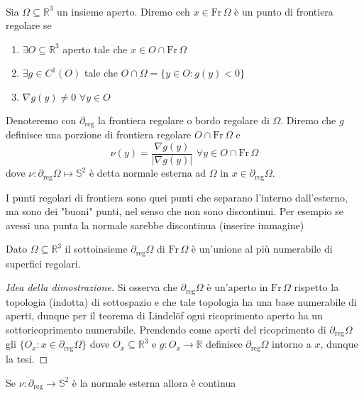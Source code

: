 \begin{definition} \hspace{1cm} \\
	Sia $\Omega \subseteq \mathbb{R}^3$ un insieme aperto. Diremo ceh $x \in \text{Fr} \, \Omega$ è un punto di frontiera regolare se
	\begin{enumerate}[label=\protect\circled{\arabic*}]
		\item $\exists O \subseteq \mathbb{R}^3$ aperto tale che $x \in O \cap \text{Fr} \, \Omega$
		\item $\exists g \in C^1(O)$ tale che $O \cap \Omega = \{y \in O : g(y) < 0 \}$
		\item $\nabla g(y) \neq 0 \, \, \forall y \in O$
	\end{enumerate}
	Denoteremo con $\partial_{\text{reg}}$ la frontiera regolare o bordo regolare di $\Omega$. Diremo che $g$ definisce una porzione di frontiera regolare
	$O \cap \text{Fr} \, \Omega$ e
	$$
	\nu(y) = \frac{\nabla g(y)}{|\nabla g(y)|} \, \, \forall y \in O \cap \text{Fr} \, \Omega
	$$
	dove $\nu: \partial_{\text{reg}} \Omega \mapsto \mathbb{S}^2$ è detta normale esterna ad $\Omega$ in $x \in \partial_{\text{reg}} \Omega$.
\end{definition}
\begin{remark}
I punti regolari di frontiera sono quei punti che separano l'interno dall'esterno, ma sono dei "buoni" punti, nel senso che non sono discontinui. Per esempio se avessi una punta la normale sarebbe discontinua (inserire immagine)
\end{remark}
\begin{prop}
	Dato $\Omega \subseteq \mathbb{R}^3$ il sottoinsieme $\partial_{\text{reg}} \Omega$ di $\text{Fr} \, \Omega$ è un'unione al più numerabile di superfici regolari.
\end{prop}
\begin{proof}[Idea della dimostrazione]
Si osserva che $\partial_{\text{reg}} \Omega$ è un'aperto in $\text{Fr} \, \Omega$ rispetto la topologia (indotta) di sottospazio e che tale topologia ha una base numerabile di aperti, dunque per il teorema di Lindelöf ogni ricoprimento aperto
ha un sottoricoprimento numerabile. Prendendo come aperti del ricoprimento di $\partial_{\text{reg}} \Omega$ gli $\{O_x : x \in \partial_{\text{reg}} \Omega \}$ dove $O_x \subseteq \mathbb{R}^3$ e $g: O_x \to \mathbb{R}$ definisce $\partial_{\text{reg}} \Omega$
intorno a $x$, dunque la tesi.
\end{proof}
\begin{prop}
Se $\nu: \partial_{\text{reg}} \to \mathbb{S}^2$ è la normale esterna allora è continua
\end{prop}
